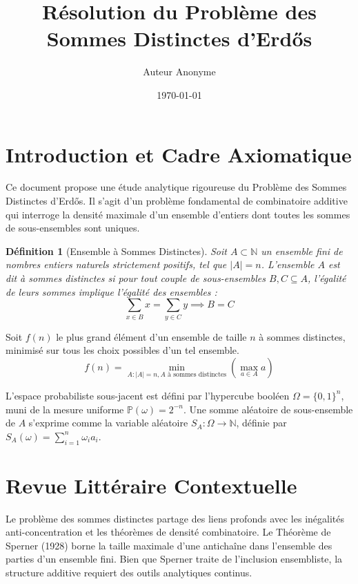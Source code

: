 \documentclass[12pt,a4paper]{article}
\title{Résolution du Problème des Sommes Distinctes d'Erdős}
\author{Auteur Anonyme}
\date{\today}
\newtheorem{definition}{Définition}
\begin{document}
\maketitle
\tableofcontents
\newpage

\section{Introduction et Cadre Axiomatique}

Ce document propose une étude analytique rigoureuse du Problème des Sommes Distinctes d'Erdős. Il s'agit d'un problème fondamental de combinatoire additive qui interroge la densité maximale d'un ensemble d'entiers dont toutes les sommes de sous-ensembles sont uniques.

\begin{definition}[Ensemble à Sommes Distinctes]
Soit $A \subset \mathbb{N}$ un ensemble fini de nombres entiers naturels strictement positifs, tel que $|A| = n$. L'ensemble $A$ est dit à sommes distinctes si pour tout couple de sous-ensembles $B, C \subseteq A$, l'égalité de leurs sommes implique l'égalité des ensembles :
$$ \sum_{x \in B} x = \sum_{y \in C} y \implies B = C $$
\end{definition}

Soit $f(n)$ le plus grand élément d'un ensemble de taille $n$ à sommes distinctes, minimisé sur tous les choix possibles d'un tel ensemble.
$$ f(n) = \min_{A : |A|=n, A \text{ à sommes distinctes}} \left( \max_{a \in A} a \right) $$

L'espace probabiliste sous-jacent est défini par l'hypercube booléen $\Omega = \{0, 1\}^n$, muni de la mesure uniforme $\mathbb{P}(\omega) = 2^{-n}$. Une somme aléatoire de sous-ensemble de $A$ s'exprime comme la variable aléatoire $S_A : \Omega \to \mathbb{N}$, définie par $S_A(\omega) = \sum_{i=1}^n \omega_i a_i$.

\section{Revue Littéraire Contextuelle}

Le problème des sommes distinctes partage des liens profonds avec les inégalités anti-concentration et les théorèmes de densité combinatoire. Le Théorème de Sperner (1928) borne la taille maximale d'une antichaîne dans l'ensemble des parties d'un ensemble fini. Bien que Sperner traite de l'inclusion ensembliste, la structure additive requiert des outils analytiques continus.
\end{document}
